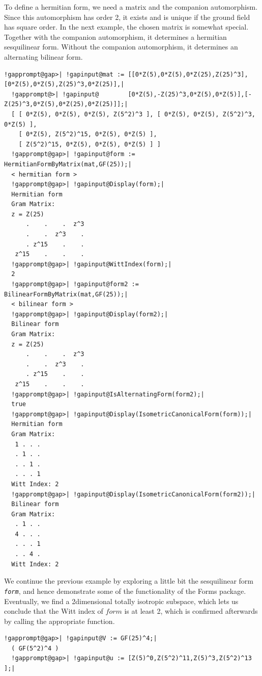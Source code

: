\documentclass[a4paper,11pt]{report}
\begin{document}
{{{\begin{Verbatim}[commandchars=!@|,fontsize=\small,frame=single,label=Example]
\end{Verbatim}
 To define a hermitian form, we need a matrix and the companion automorphism.
Since this automorphism has order 2, it exists and is unique if the ground
field has square order. In the next example, the chosen matrix is somewhat
special. Together with the companion automorphism, it determines a hermitian
sesquilinear form. Without the companion automorphism, it determines an
alternating bilinear form. 
\begin{Verbatim}[commandchars=!@|,fontsize=\small,frame=single,label=Example]
  !gapprompt@gap>| !gapinput@mat := [[0*Z(5),0*Z(5),0*Z(25),Z(25)^3],[0*Z(5),0*Z(5),Z(25)^3,0*Z(25)],|
  !gapprompt@>| !gapinput@        [0*Z(5),-Z(25)^3,0*Z(5),0*Z(5)],[-Z(25)^3,0*Z(5),0*Z(25),0*Z(25)]];|
  [ [ 0*Z(5), 0*Z(5), 0*Z(5), Z(5^2)^3 ], [ 0*Z(5), 0*Z(5), Z(5^2)^3, 0*Z(5) ], 
    [ 0*Z(5), Z(5^2)^15, 0*Z(5), 0*Z(5) ], 
    [ Z(5^2)^15, 0*Z(5), 0*Z(5), 0*Z(5) ] ]
  !gapprompt@gap>| !gapinput@form := HermitianFormByMatrix(mat,GF(25));|
  < hermitian form >
  !gapprompt@gap>| !gapinput@Display(form);|
  Hermitian form
  Gram Matrix:
  z = Z(25)
      .    .    .  z^3
      .    .  z^3    .
      . z^15    .    .
   z^15    .    .    .
  !gapprompt@gap>| !gapinput@WittIndex(form);|
  2
  !gapprompt@gap>| !gapinput@form2 := BilinearFormByMatrix(mat,GF(25));|
  < bilinear form >
  !gapprompt@gap>| !gapinput@Display(form2);|
  Bilinear form
  Gram Matrix:
  z = Z(25)
      .    .    .  z^3
      .    .  z^3    .
      . z^15    .    .
   z^15    .    .    .
  !gapprompt@gap>| !gapinput@IsAlternatingForm(form2);|
  true
  !gapprompt@gap>| !gapinput@Display(IsometricCanonicalForm(form));|
  Hermitian form
  Gram Matrix:
   1 . . .
   . 1 . .
   . . 1 .
   . . . 1
  Witt Index: 2
  !gapprompt@gap>| !gapinput@Display(IsometricCanonicalForm(form2));|
  Bilinear form
  Gram Matrix:
   . 1 . .
   4 . . .
   . . . 1
   . . 4 .
  Witt Index: 2
\end{Verbatim}
 We continue the previous example by exploring a little bit the sesquilinear
form \mbox{\texttt{\mdseries\slshape form}}, and hence demonstrate some of the functionality of the \textsf{Forms} package. Eventually, we find a 2\texttt{}dimensional totally
isotropic subspace, which lets us conclude that the Witt index of $form$ is at least 2, which is confirmed afterwards by calling the appropriate
function. 
\begin{Verbatim}[commandchars=!@|,fontsize=\small,frame=single,label=Example]
  !gapprompt@gap>| !gapinput@V := GF(25)^4;|
  ( GF(5^2)^4 )
  !gapprompt@gap>| !gapinput@u := [Z(5)^0,Z(5^2)^11,Z(5)^3,Z(5^2)^13 ];|

\end{Verbatim}}}}
\end{document}
